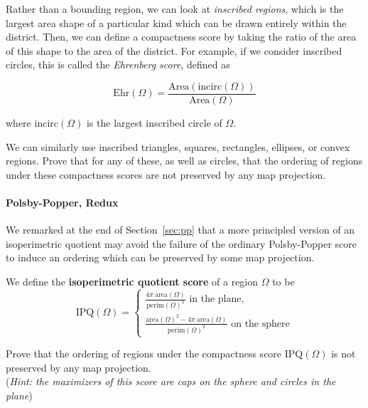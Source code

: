Rather than a bounding region, we can look at \textit{inscribed regions}, which is the largest area shape of a particular kind which can be drawn entirely within the district.  Then, we can define a compactness score by taking the ratio of the area of this shape to the area of the district.  For example, if we consider inscribed circles, this is called the \textit{Ehrenberg score}, defined as

$$\mathrm{Ehr}(\Omega) = \frac{\mathrm{Area}(\mathrm{incirc}(\Omega))}{\mathrm{Area}(\Omega)}$$

where $\mathrm{incirc}(\Omega)$ is the largest inscribed circle of $\Omega$.

We can similarly use inscribed triangles, squares, rectangles, ellipses, or convex regions.  Prove that for any of these, as well as circles, that the ordering of regions under these compactness scores are not preserved by any map projection.



\paragraph{Polsby-Popper, Redux}
We remarked at the end of Section~\ref{sec:pp} that a more principled version of an isoperimetric quotient may avoid the failure of the ordinary Polsby-Popper score to induce an ordering which can be preserved by some map projection.

We define the \textbf{isoperimetric quotient score} of a region $\Omega$ to be$$
\mathrm{IPQ}(\Omega)=
\begin{cases}
\frac{4\pi \ \mathrm{area}(\Omega)}{\mathrm{perim}(\Omega)^2} \text{ in the plane},\\[10pt]
\frac{\mathrm{area}(\Omega)^2 - 4\pi \ \mathrm{area}(\Omega)}{\mathrm{perim}(\Omega)^2}\text{ on the sphere}
\end{cases}
$$

Prove that the ordering of regions  under the compactness score $\mathrm{IPQ}(\Omega)$ is not preserved by any map projection.\\ (\textit{Hint: the maximizers of this score are caps on the sphere and circles in the plane})

